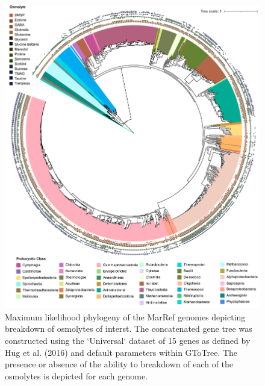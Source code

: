 \documentclass[utf8]{frontiers_suppmat} %
\begin{document}
\begin{figure}
    \centering
    \includegraphics[width=0.9\columnwidth]{Figures/SI-Bacterial-Phylogeny-Breakdown-01-01.png}
    \caption{Maximum likelihood phylogeny of the MarRef genomes depicting breakdown of osmolytes of interst. The concatenated gene tree was constructed using the `Universal` dataset of 15 genes as defined by Hug et al. (2016) and default parameters within GToTree. The presence or absence of the ability to breakdown of each of the osmolytes is depicted for each genome.
}
    \label{fig:phybd}
\end{figure}
\end{document}
